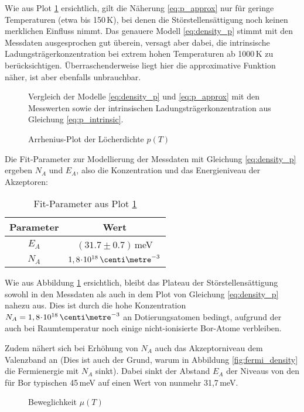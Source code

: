 Wie aus Plot \ref{fig:plot_p} ersichtlich, gilt die Näherung \eqref{eq:p_approx} nur für geringe Temperaturen (etwa bis 150\,K), bei denen die Störstellensättigung noch keinen merklichen Einfluss nimmt. Das genauere Modell \eqref{eq:density_p} stimmt mit den Messdaten ausgesprochen gut überein, versagt aber dabei, die intrinsische Ladungsträgerkonzentration bei extrem hohen Temperaturen ab 1000\,K zu berücksichtigen.
Überraschenderweise liegt hier die approximative Funktion näher, ist aber ebenfalls unbrauchbar.

\begin{figure}[p]
\centering
\begin{sideways}

\end{sideways}
\caption{Arrhenius-Plot der Löcherdichte $p(T)$}
\label{fig:plot_p}
\vspace{1ex}
Vergleich der Modelle \eqref{eq:density_p} und \eqref{eq:p_approx} mit den Messwerten sowie der intrinsischen Ladungsträgerkonzentration aus Gleichung \eqref{eq:p_intrinsic}.
\end{figure}

Die Fit-Parameter zur Modellierung der Messdaten mit Gleichung \eqref{eq:density_p} ergeben $N_A$ und $E_A$, also die Konzentration und das Energieniveau der Akzeptoren:
\begin{table}[h!]
\centering
\caption{Fit-Parameter aus Plot \ref{fig:plot_p}} \label{tab:p_fit}
\begin{tabular}{cc}
	\toprule
	Parameter		& Wert 							\\
	\midrule
	$E_A$		& $(31.7 \pm 0.7)\,$meV				\\
	$N_A$		& $1,8 \cdt 10^{18}\,\centi\metre^{-3}$	\\
	\bottomrule
\end{tabular}
\end{table}

Wie aus Abbildung \ref{fig:plot_p} ersichtlich, bleibt das Plateau der Störstellensättigung sowohl in den Messdaten als auch in dem Plot von Gleichung \eqref{eq:density_p} nahezu aus. Dies ist durch die hohe Konzentration $N_A = 1,8\cdt 10^{18}\,\centi\metre^{-3}$ an Dotierungsatomen bedingt, aufgrund der auch bei Raumtemperatur noch einige nicht-ionisierte Bor-Atome verbleiben.

Zudem nähert sich bei Erhöhung von $N_A$ auch das Akzeptorniveau dem Valenzband an (Dies ist auch der Grund, warum in Abbildung \ref{fig:fermi_density} die Fermienergie mit $N_A$ sinkt). Dabei sinkt der Abstand $E_A$ der Niveaus von den für Bor typischen 45\,meV auf einen Wert von nunmehr 31,7\,meV.

\begin{figure}[p]
\centering
\begin{sideways}

\end{sideways}
\caption{Beweglichkeit $\mu(T)$}
\label{fig:plot_mu}
\end{figure}
